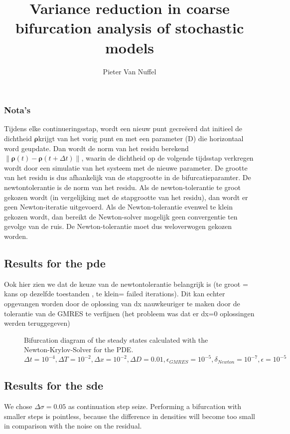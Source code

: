 \documentclass[]{article}
\title{Variance reduction in coarse bifurcation analysis of stochastic models}
\author{Pieter Van Nuffel}
\newcommand{\norm}[1]{\left\|#1\right\|} %
\newcommand{\U}{\ensuremath{\boldsymbol{\rho}}}
\theoremstyle{definition}
\begin{document}
\subsubsection{Nota's}
Tijdens elke continueringsstap, wordt een nieuw punt gecreëerd dat initieel de dichtheid \U krijgt van het vorig punt en met een parameter (D) die horizontaal word geupdate. Dan wordt de norm van het residu berekend $\norm{ \U(t) - \U(t+\Delta t)} $, waarin de dichtheid op de volgende tijdsstap verkregen wordt door een simulatie van het systeem met de nieuwe parameter. De grootte van het residu is dus afhankelijk van de stapgrootte in de bifurcatieparamter. De newtontolerantie is de norm van het residu. Als de newton-tolerantie te groot gekozen wordt (in vergelijking met de stapgrootte van het residu), dan wordt er geen Newton-iteratie uitgevoerd. Als de Newton-tolerantie evenwel te klein gekozen wordt, dan bereikt de Newton-solver mogelijk geen convergentie ten gevolge van de ruis. De Newton-tolerantie moet dus weloverwogen gekozen worden. 



\subsection{Results for the pde}
Ook hier zien we dat de keuze van de newtontolerantie belangrijk is (te groot = kans op dezelfde toestanden , te klein= failed iterations).
Dit kan echter opgevangen worden door de oplossing van dx nauwkeuriger te maken door de tolerantie van de GMRES te verfijnen (het probleem was dat er dx=0 oplossingen werden teruggegeven) 

\begin{figure}
\caption{  Bifurcation diagram of the steady states calculated with the Newton-Krylov-Solver for the PDE. $\Delta t = 10^{-4}, \Delta T = 10^{-2}, \Delta x = 10^{-2}, \Delta D = 0.01, \epsilon_{GMRES}=10^{-5},  \delta_{Newton} = 10^{-7}, \epsilon=10^{-5}$
}
\end{figure}

\subsection{Results for the sde}
We chose $\Delta \sigma = 0.05$ as continuation step seize. Performing a bifurcation with smaller steps is pointless, because the difference in densities will become too small in comparison with the noise on the residual.
\end{document}
